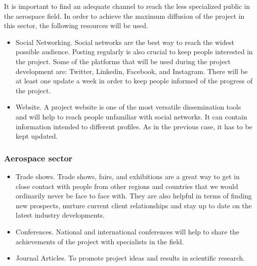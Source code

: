 It is important to find an adequate channel to reach the less specialized public in the aerospace field. In order to achieve the maximum diffusion of the project in this sector,  the following resources will be used.

\begin{itemize}
\item{ 
	Social Networking. Social networks are the best way to reach the widest possible audience. Posting regularly is also crucial to keep people interested in the project. Some of the platforms that will be used during the project development are: Twitter, Linkedin, Facebook, and Instagram. There will be at least one update a week in order to keep people informed of the progress of the project.
}
\item {
	Website. A project website is one of the most versatile dissemination tools and will help to reach people unfamiliar with social networks. It can contain information intended to different profiles. As in the previous case, it has to be kept updated.
}
\end{itemize}

\subsubsection{Aerospace sector}


\begin{itemize}

\item{
	Trade shows. Trade shows, fairs, and exhibitions are a great way to get in close contact with people from other regions and countries that we would ordinarily never be face to face with. They are also helpful in terms of finding new prospects, nurture current client relationships and stay up to date on the latest industry developments. 
}
\item {
	Conferences. National and international conferences will help to share the achievements of the project with specialists in the field.
}
\item {
	Journal Articles. To promote project ideas and results in scientific research.
}
\end{itemize}